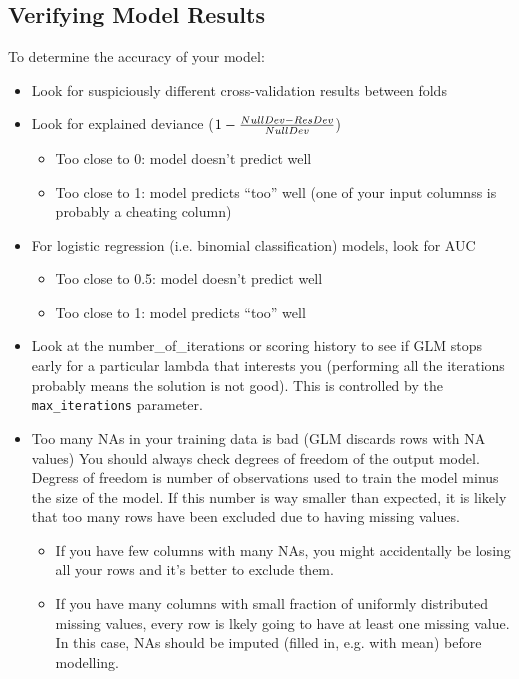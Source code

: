 \subsection{Verifying Model Results}

To determine the accuracy of your model: 

\begin{itemize}
\item Look for suspiciously different cross-validation results between folds

\waterExampleInR


\item Look for explained deviance ($1 - {NullDev - ResDev \over NullDev}$)  
      \begin{itemize}
      \item Too close to 0:  model doesn’t predict well
      \item Too close to 1:  model predicts “too” well (one of your input columnss is probably a cheating column)
      \end{itemize}
\item For logistic regression (i.e. binomial classification) models, look for AUC
      \begin{itemize}
      \item Too close to 0.5:  model doesn’t predict well
      \item Too close to 1:  model predicts “too” well
      \end{itemize}
\item Look at the number\_of\_iterations or scoring history to see if GLM stops early for a particular
      lambda that interests you (performing all the iterations probably means the solution is not good).  This is
      controlled by the \texttt{max\_iterations} parameter.
\item Too many NAs in your training data is bad (GLM discards rows with NA values)
     You should always check degrees of freedom of the output model. Degress of freedom is number of observations used to train the model minus the size of the model. If this number is way smaller than expected, it is likely that too many rows have been excluded due to having missing values. 

      \begin{itemize}
      \item If you have few columns with many NAs, you might accidentally be losing all your rows and it's better to exclude them.
      \item If you have many columns with small fraction of uniformly distributed missing values, every row is lkely going to have at least one missing value. In this case, NAs should be imputed (filled in, e.g. with mean) before modelling.
      \end{itemize}
\end{itemize}

